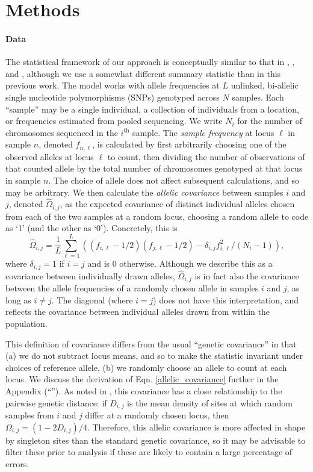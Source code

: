 \documentclass[12pt]{article}
\newcommand{\secref}[1]{``\nameref{#1}''}
\begin{document}
\section*{Methods}

\paragraph{Data}
The statistical framework of our approach is conceptually similar to that in \cite{Wasser2004}, \cite{BEDASSLE}, and \cite{spacemix},
although we use a somewhat different summary statistic than in this previous work.
The model works with allele frequencies at $L$ unlinked, bi-allelic single nucleotide polymorphisms (SNPs) genotyped across $N$ samples.
Each ``sample'' may be a single individual,  
a collection of individuals from a location, 
or frequencies estimated from pooled sequencing.
We write $N_i$ for the number of chromosomes sequenced in the $i^\text{th}$ sample.
The \emph{sample frequency} at locus $\ell$ in sample $n$, denoted $f_{n,\ell}$, 
is calculated by first arbitrarily choosing one of the observed alleles at locus $\ell$ to count, 
then dividing the number of observations of that counted allele by the total number of chromosomes genotyped at that locus
in sample $n$.
The choice of allele does not affect subsequent calculations, and so may be arbitrary.
We then calculate the \emph{allelic covariance} between samples $i$ and $j$, denoted $\widehat{\Omega}_{i,j}$,
as the expected covariance of distinct individual alleles chosen from each of the two samples at a random locus,
choosing a random allele to code as `1' (and the other as `0').
Concretely, this is
\begin{equation}
\widehat{\Omega}_{i,j} = 
    \frac{1}{L} \sum_{\ell=1}^L \left( (f_{i,\ell}-1/2) (f_{j,\ell}-1/2) - \delta_{i,j} f_{i,\ell}^2 / (N_i-1) \right),
\label{allelic_covariance}
\end{equation}
where $\delta_{i,j}=1$ if $i=j$ and is 0 otherwise.
Although we describe this as a covariance between individually drawn alleles,
$\widehat{\Omega}_{i,j}$ is in fact also the covariance between the allele frequencies
of a randomly chosen allele in samples $i$ and $j$, as long as $i \neq j$.
The diagonal (where $i=j$) does not have this interpretation, 
and reflects the covariance between individual alleles drawn from within the population.

This definition of covariance differs from the usual ``genetic covariance'' \citep{mcvean_genealogical_2009}
in that (a) we do not subtract locus means,
and so to make the statistic invariant under choices of reference allele, 
(b) we randomly choose an allele to count at each locus.
We discuss the derivation of Eqn. \eqref{allelic_covariance} further in the Appendix (\secref{allelic_cov}).
As noted in \cite{EEMS},
this covariance has a close relationship to the pairwise genetic distance:
if $D_{i,j}$ is the mean density of sites at which random samples from $i$ and $j$ differ at a randomly chosen locus,
then $\Omega_{i,j} = (1 - 2 D_{i,j})/4$.
Therefore, 
this allelic covariance is more affected in shape by singleton sites
than the standard genetic covariance,
so it may be advisable to filter these prior to analysis
if these are likely to contain a large percentage of errors.
\end{document}
